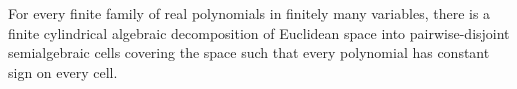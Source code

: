 For every finite family of real polynomials in finitely many variables, there is a finite cylindrical algebraic decomposition of Euclidean space into pairwise-disjoint semialgebraic cells covering the space such that every polynomial has constant sign on every cell.